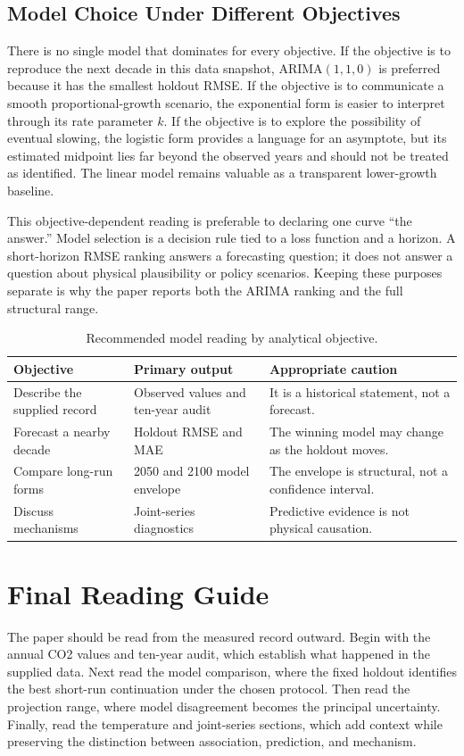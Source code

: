 \documentclass{mcmthesis}
\begin{document}
\begin{appendices}
\subsection{Model Choice Under Different Objectives}
There is no single model that dominates for every objective. If the objective is to reproduce the next decade in this data snapshot, ARIMA$(1,1,0)$ is preferred because it has the smallest holdout RMSE. If the objective is to communicate a smooth proportional-growth scenario, the exponential form is easier to interpret through its rate parameter $k$. If the objective is to explore the possibility of eventual slowing, the logistic form provides a language for an asymptote, but its estimated midpoint lies far beyond the observed years and should not be treated as identified. The linear model remains valuable as a transparent lower-growth baseline.

This objective-dependent reading is preferable to declaring one curve ``the answer.'' Model selection is a decision rule tied to a loss function and a horizon. A short-horizon RMSE ranking answers a forecasting question; it does not answer a question about physical plausibility or policy scenarios. Keeping these purposes separate is why the paper reports both the ARIMA ranking and the full structural range.

\begin{table}[H]
\centering
\small
\caption{Recommended model reading by analytical objective.}
\begin{tabularx}{\textwidth}{lXX}
\toprule
Objective & Primary output & Appropriate caution \\
\midrule
Describe the supplied record & Observed values and ten-year audit & It is a historical statement, not a forecast. \\
Forecast a nearby decade & Holdout RMSE and MAE & The winning model may change as the holdout moves. \\
Compare long-run forms & 2050 and 2100 model envelope & The envelope is structural, not a confidence interval. \\
Discuss mechanisms & Joint-series diagnostics & Predictive evidence is not physical causation. \\
\bottomrule
\end{tabularx}
\end{table}

\section{Final Reading Guide}
The paper should be read from the measured record outward. Begin with the annual CO2 values and ten-year audit, which establish what happened in the supplied data. Next read the model comparison, where the fixed holdout identifies the best short-run continuation under the chosen protocol. Then read the projection range, where model disagreement becomes the principal uncertainty. Finally, read the temperature and joint-series sections, which add context while preserving the distinction between association, prediction, and mechanism.


\end{appendices}
\end{document}
